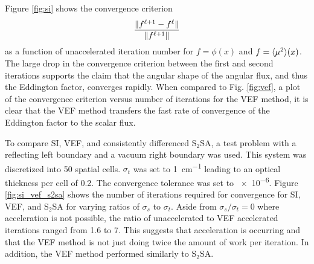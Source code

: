 Figure \ref{fig:si} shows the convergence criterion
	\begin{equation}
		\frac{\| f^{\ell+1} - f^\ell \|}{\| f^{\ell+1} \|} 
	\end{equation}
as a function of unaccelerated iteration number for $f = \phi(x)$ and $f = \langle \mu^2 \rangle(x)$. The large drop in the convergence criterion between the first and second iterations supports the claim that the angular shape of the angular flux, and thus the Eddington factor, converges rapidly. When compared to Fig. \ref{fig:vef}, a plot of the convergence criterion versus number of iterations for the VEF method, it is clear that the VEF method transfers the fast rate of convergence of the Eddington factor to the scalar flux. 



To compare SI, VEF, and consistently differenced S$_2$SA, a test problem with a reflecting left boundary and a vacuum right boundary was used. This system was discretized into 50 spatial cells. $\sigma_t$ was set to \SI{1}{cm^{-1}} leading to an optical thickness per cell of 0.2. The convergence tolerance was set to \num{e-6}. Figure \ref{fig:si_vef_s2sa} shows the number of iterations required for convergence for SI, VEF, and S$_2$SA for varying ratios of $\sigma_s$ to $\sigma_t$. Aside from $\sigma_s/\sigma_t = 0$ where acceleration is not possible, the ratio of unaccelerated to VEF accelerated iterations ranged from 1.6 to 7. This suggests that acceleration is occurring and that the VEF method is not just doing twice the amount of work per iteration. In addition, the VEF method performed similarly to S$_2$SA. 

